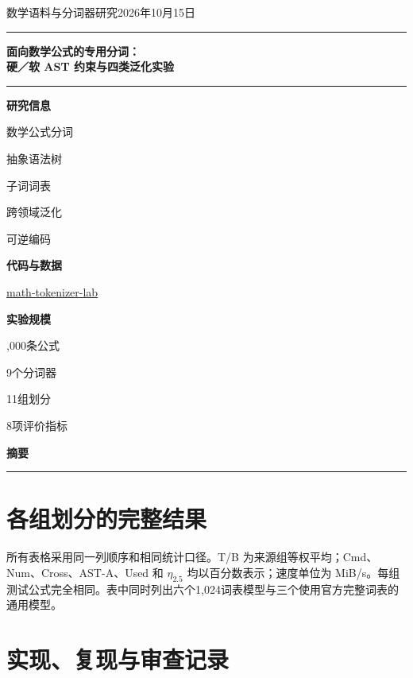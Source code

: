 \documentclass[UTF8,a4paper,11pt,fontset=none]{ctexart}
\begin{document}
\thispagestyle{empty}
\noindent\textcolor{accent}{\small 数学语料与分词器研究\hfill 2026年10月15日}
\vspace{5pt}\hrule\vspace{15pt}
\begin{center}
{\LARGE\bfseries 面向数学公式的专用分词：\\[6pt]硬／软 AST 约束与四类泛化实验}\par
\vspace{10pt}{\normalsize 肖童仁}\par
\vspace{4pt}{\small Design and Evaluation of Specialized Tokenizers for Mathematical Formulas}
\end{center}
\vspace{8pt}\hrule\vspace{9pt}
\noindent\begin{minipage}[t]{.23\linewidth}
\textbf{研究信息}\par\smallskip\small
数学公式分词\par 抽象语法树\par 子词词表\par 跨领域泛化\par 可逆编码\par
\medskip\textbf{代码与数据}\par\smallskip
\href{https://github.com/xtr1976536/math-tokenizer-lab}{math-tokenizer-lab}\par
\medskip\textbf{实验规模}\par{},000条公式\par 9个分词器\par 11组划分\par 8项评价指标
\end{minipage}\hfill\begin{minipage}[t]{.72\linewidth}
\textbf{摘\quad 要}\par\smallskip

\end{minipage}
\vspace{10pt}\hrule\vspace{9pt}

\FloatBarrier


\clearpage\appendix
\section{各组划分的完整结果}
所有表格采用同一列顺序和相同统计口径。T/B 为来源组等权平均；Cmd、Num、Cross、AST-A、Used 和 $\eta_{2.5}$ 均以百分数表示；速度单位为 MiB/s。每组测试公式完全相同。表中同时列出六个1,024词表模型与三个使用官方完整词表的通用模型。

\FloatBarrier
\section{实现、复现与审查记录}


\end{document}
